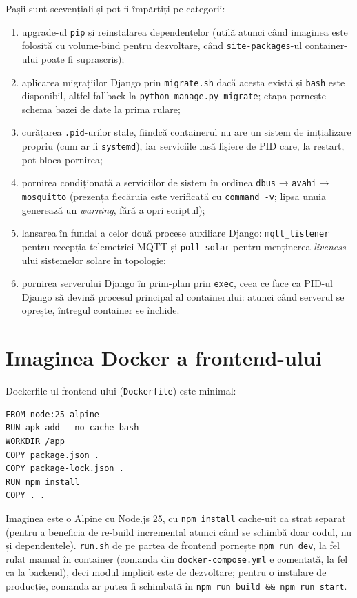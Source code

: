 Pașii sunt secvențiali și pot fi împărțiți pe categorii:
\begin{enumerate}
    \item upgrade-ul \texttt{pip} și reinstalarea dependențelor (utilă atunci când imaginea este folosită cu volume-bind pentru dezvoltare, când \texttt{site-packages}-ul container-ului poate fi suprascris);
    \item aplicarea migrațiilor Django prin \texttt{migrate.sh} dacă acesta există și \texttt{bash} este disponibil, altfel fallback la \texttt{python manage.py migrate}; etapa pornește schema bazei de date la prima rulare;
    \item curățarea \texttt{.pid}-urilor stale, fiindcă containerul nu are un sistem de inițializare propriu (cum ar fi \texttt{systemd}), iar serviciile lasă fișiere de PID care, la restart, pot bloca pornirea;
    \item pornirea condiționată a serviciilor de sistem în ordinea \texttt{dbus} → \texttt{avahi} → \texttt{mosquitto} (prezența fiecăruia este verificată cu \texttt{command -v}; lipsa unuia generează un \emph{warning}, fără a opri scriptul);
    \item lansarea în fundal a celor două procese auxiliare Django: \texttt{mqtt\_listener} pentru recepția telemetriei MQTT și \texttt{poll\_solar} pentru menținerea \emph{liveness}-ului sistemelor solare în topologie;
    \item pornirea serverului Django în prim-plan prin \texttt{exec}, ceea ce face ca PID-ul Django să devină procesul principal al containerului: atunci când serverul se oprește, întregul container se închide.
\end{enumerate}

\section{Imaginea Docker a frontend-ului}
Dockerfile-ul frontend-ului (\texttt{Dockerfile}) este minimal:
\begin{verbatim}
FROM node:25-alpine
RUN apk add --no-cache bash
WORKDIR /app
COPY package.json .
COPY package-lock.json .
RUN npm install
COPY . .
\end{verbatim}
Imaginea este o Alpine cu Node.js 25, cu \texttt{npm install} cache-uit ca strat separat (pentru a beneficia de re-build incremental atunci când se schimbă doar codul, nu și dependențele). \texttt{run.sh} de pe partea de frontend pornește \texttt{npm run dev}, la fel rulat manual în container (comanda din \texttt{docker-compose.yml} e comentată, la fel ca la backend), deci modul implicit este de dezvoltare; pentru o instalare de producție, comanda ar putea fi schimbată în \texttt{npm run build \&\& npm run start}.

